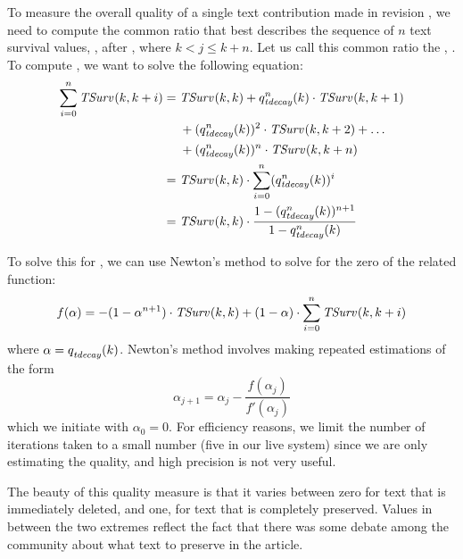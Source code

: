 To measure the overall quality of a single text contribution
made in revision , we need to compute the common ratio
that best describes the sequence of $n$ text survival values,
, after , where $k < j \le k+n$.
Let us call this common ratio the ,
.
To compute , we want to solve the following equation:
\begin{align*}
    \sum_{i=0}^n \tsurv{}{k,k+i} = {} & \tsurv{}{k,k} + \quality{tdecay}{n}{k} \cdot \tsurv{}{k,k+1} \\
    & + (\quality{tdecay}{n}{k})^2 \cdot \tsurv{}{k,k+2} + \ldots \\
    & + (\quality{tdecay}{n}{k})^n \cdot \tsurv{}{k,k+n} \\
    = {} & \tsurv{}{k,k} \cdot \sum_{i=0}^n (\quality{tdecay}{n}{k})^i \\
    = {} & \tsurv{}{k,k} \cdot \frac{1 - (\quality{tdecay}{n}{k})^{n+1}}{1 - \quality{tdecay}{n}{k}} \\
\end{align*}

To solve this for , we can use Newton's method
to solve for the zero of the related function:
\begin{equation*}
  f(\alpha) =
        - (1 - \alpha^{n+1}) \cdot \mathit{TSurv}_{}(k,k)
        + (1 - \alpha) \cdot \sum_{i=0}^n \mathit{TSurv}_{}(k,k+i)
\end{equation*}
where $\alpha = \quality{tdecay}{}{k}$.
Newton's method involves making repeated estimations of the form
\begin{equation*}
  \alpha_{j+1} = \alpha_j - \frac{f(\alpha_j)}{f'(\alpha_j)}
\end{equation*}
which we initiate with $\alpha_0 = 0$.
For efficiency reasons, we limit the number of iterations taken
to a small number (five in our live system)
since we are only estimating the quality, and high precision
is not very useful.

The beauty of this quality measure is that it varies between
zero for text that is immediately deleted, and one, for text
that is completely preserved.
Values in between the two extremes reflect the fact that there
was some debate among the community about what text to preserve
in the article.

